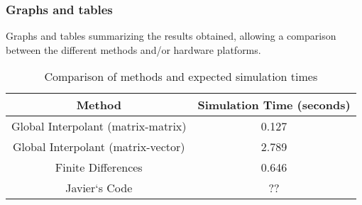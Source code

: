 \subsubsection{Graphs and tables}

 Graphs and tables summarizing the results obtained, allowing a comparison between the different methods and/or hardware platforms.






\begin{table}[h!]
\centering
\begin{tabular}{|c|c|}
\hline
\textbf{Method} & \textbf{Simulation Time (seconds)} \\ \hline
Global Interpolant (matrix-matrix) &  0.127 \\ \hline
Global Interpolant (matrix-vector) &  2.789   \\ \hline
Finite Differences & 0.646 \\ \hline
Javier`s Code & ?? \\ \hline
\end{tabular}
\caption{Comparison of methods and expected simulation times}
\label{table:methods_time}
\end{table}







